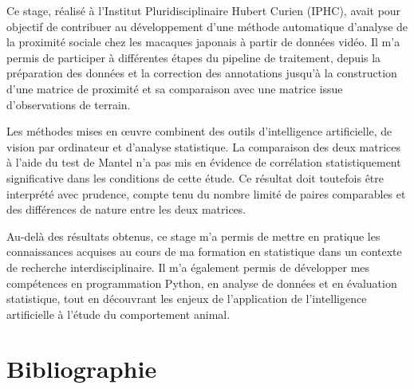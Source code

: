 \documentclass[11pt,a4paper]{report}
\begin{document}
Ce stage, réalisé à l'Institut Pluridisciplinaire Hubert Curien (IPHC),
avait pour objectif de contribuer au développement d'une méthode
automatique d'analyse de la proximité sociale chez les macaques japonais
à partir de données vidéo. Il m'a permis de participer à différentes
étapes du pipeline de traitement, depuis la préparation des données et
la correction des annotations jusqu'à la construction d'une matrice de
proximité et sa comparaison avec une matrice issue d'observations de
terrain.

Les méthodes mises en œuvre combinent des outils d'intelligence
artificielle, de vision par ordinateur et d'analyse statistique. La
comparaison des deux matrices à l'aide du test de Mantel n'a pas mis en
évidence de corrélation statistiquement significative dans les conditions
de cette étude. Ce résultat doit toutefois être interprété avec
prudence, compte tenu du nombre limité de paires comparables et des
différences de nature entre les deux matrices.

Au-delà des résultats obtenus, ce stage m'a permis de mettre en pratique
les connaissances acquises au cours de ma formation en statistique dans
un contexte de recherche interdisciplinaire. Il m'a également permis de
développer mes compétences en programmation Python, en analyse de
données et en évaluation statistique, tout en découvrant les enjeux de
l'application de l'intelligence artificielle à l'étude du comportement
animal.



\chapter*{Bibliographie}
\end{document}
